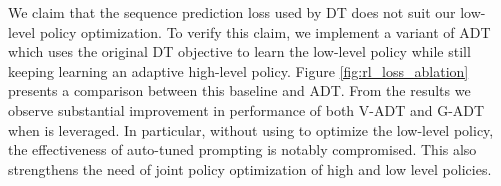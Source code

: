 We claim that the sequence prediction loss used by DT does not suit our low-level policy optimization. 
To verify this claim, we implement a variant of ADT which uses the original DT objective to learn the low-level policy while still keeping learning an adaptive high-level policy. 
Figure \ref{fig:rl_loss_ablation} presents a comparison between this baseline and ADT.  
From the results we observe substantial improvement in performance of both V-ADT and G-ADT when  is leveraged. 
In particular, without using  to optimize the low-level policy, the effectiveness of auto-tuned prompting is  notably compromised. 
This also strengthens the need of joint policy optimization of high and low level policies. 






